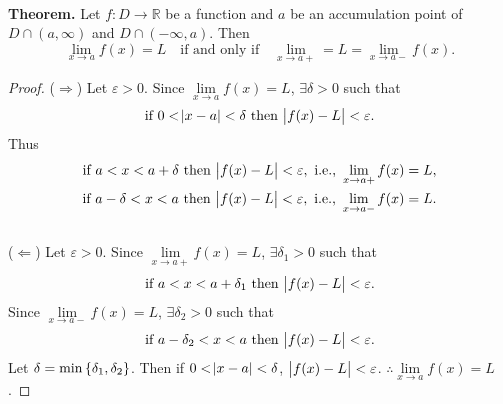 \documentclass[12pt,a4paper]{article}
\begin{document}
\
\begin{tcolorbox}[colback=white]
	\textbf{Theorem.} Let $f:D\to\mathbb{R}$ be a function and $a$ be an accumulation point of $D\cap(a,\infty)$ and $D\cap(-\infty,a)$. Then \[
	\lim\limits_{x\to a}f(x)=L\quad \text{if and only if}\quad \lim\limits_{x\to a+} = L=\lim\limits_{x\to a-}f(x).
	\]\tcblower\begin{proof}
		($\Rightarrow$) Let $\varepsilon>0$. Since $\lim\limits_{x\to a}f(x)=L$, $\exists\delta>0$ such that \[
		\text{if}\ 0<\abs{x-a}<\delta\ \text{then}\ \abs{f(x)-L}<\varepsilon.
		\] Thus \begin{align*}
		\text{if}\ a<x<a+\delta\ \text{then}\ \abs{f(x)-L}<\varepsilon,\ \text{i.e.,}\ \lim\limits_{x\to a+}f(x) = L, \\
		\text{if}\ a-\delta<x<a\ \text{then}\ \abs{f(x)-L}<\varepsilon,\ \text{i.e.,}\ \lim\limits_{x\to a-}f(x) = L.
		\end{align*}\
		\\
		($\Leftarrow$) Let $\varepsilon>0$. Since $\lim\limits_{x\to a+}f(x)=L$, $\exists\delta_1>0$ such that \[
		\text{if}\ a<x<a+\delta_1\ \text{then}\ \abs{f(x)-L}<\varepsilon.
		\] Since $\lim\limits_{x\to a-}f(x)=L$, $\exists\delta_2>0$ such that \[
		\text{if}\ a-\delta_2<x<a\ \text{then}\ \abs{f(x)-L}<\varepsilon.
		\] Let $\delta=\min\set{\delta_1,\delta_2}$. Then if $0<\abs{x-a}<\delta$,\ $\abs{f(x)-L}<\varepsilon$. $\therefore\lim\limits_{x\to a}f(x)=L$.
	\end{proof}
\end{tcolorbox}\
\end{document}
